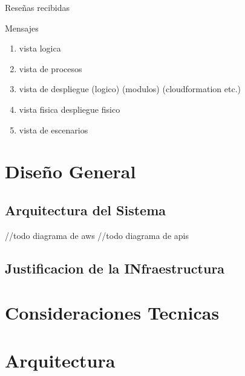 \documentclass{article}
\begin{document}
      Reseñas recibidas  

      Mensajes 

      \begin{enumerate}
        \item vista logica
        \item vista de procesos
        \item vista de despliegue
            (logico)
            (modulos)
            (cloudformation etc.)
        \item vista fisica
          despliegue fisico
        \item vista de escenarios

      \end{enumerate}
      
\section{Dise\~no General}
  
  \subsection{Arquitectura del Sistema}
  //todo diagrama de aws
  //todo diagrama de apis
  \subsection{Justificacion de la INfraestructura}

\section{Consideraciones Tecnicas}
\newpage

\section{Arquitectura}
\newpage
\end{document}
